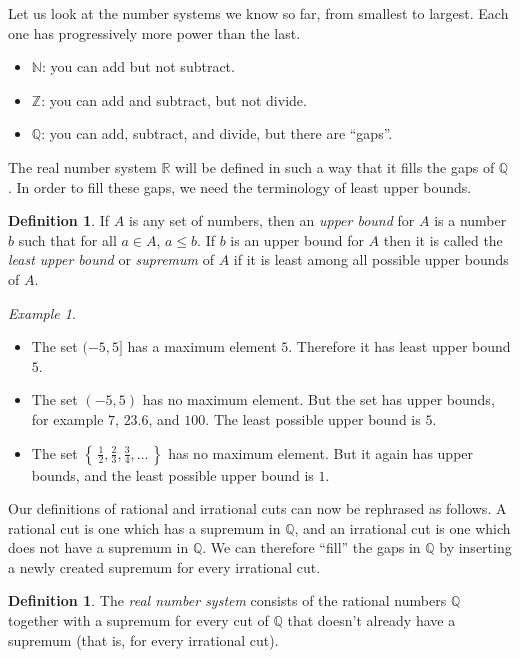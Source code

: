 \documentclass[11pt,oneside]{amsbook}
\newcommand{\set}[1]{\left\{\,#1\,\right\}}
\newcommand{\N}{\mathbb N}
\newcommand{\Z}{\mathbb Z}
\newcommand{\Q}{\mathbb Q}
\newcommand{\R}{\mathbb R}
\theoremstyle{definition}
\theoremstyle{plain}
\theoremstyle{definition}
\newtheorem{definition}[theorem]{Definition}
\theoremstyle{remark}
\newtheorem{example}[theorem]{Example}
\numberwithin{equation}{section}
\numberwithin{figure}{section}
\begin{document}
Let us look at the number systems we know so far, from smallest to largest. Each one has progressively more power than the last.
\begin{itemize}
\item $\N$: you can add but not subtract.
\item $\Z$: you can add and subtract, but not divide.
\item $\Q$: you can add, subtract, and divide, but there are ``gaps''.
\end{itemize}

The real number system $\R$ will be defined in such a way that it fills the gaps of $\Q$. In order to fill these gaps, we need the terminology of least upper bounds.

\begin{definition}
  If $A$ is any set of numbers, then an \emph{upper bound} for $A$ is a number $b$ such that for all $a\in A$, $a\leq b$. If $b$ is an upper bound for $A$ then it is called the \emph{least upper bound} or \emph{supremum} of $A$ if it is least among all possible upper bounds of $A$.
\end{definition}

\begin{example}
  \begin{itemize}
  \item The set $(-5,5]$ has a maximum element $5$. Therefore it has least upper bound $5$.
  \item The set $(-5,5)$ has no maximum element. But the set has upper bounds, for example $7$, $23.6$, and $100$. The least possible upper bound is $5$.
  \item The set $\set{\frac12,\frac23,\frac34,\ldots}$ has no maximum element. But it again has upper bounds, and the least possible upper bound is $1$.
  \end{itemize}
\end{example}

Our definitions of rational and irrational cuts can now be rephrased as follows. A rational cut is one which has a supremum in $\Q$, and an irrational cut is one which does not have a supremum in $\Q$. We can therefore ``fill'' the gaps in $\Q$ by inserting a newly created supremum for every irrational cut.

\begin{definition}
  The \emph{real number system} consists of the rational numbers $\Q$ together with a supremum for every cut of $\Q$ that doesn't already have a supremum (that is, for every irrational cut).
\end{definition}
\end{document}
